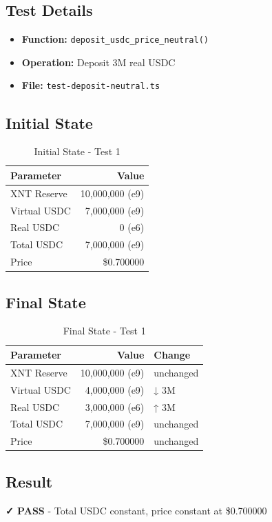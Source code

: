 \documentclass[11pt,a4paper]{article}
\begin{document}
\subsection{Test Details}
\begin{itemize}
    \item \textbf{Function:} \texttt{deposit\_usdc\_price\_neutral()}
    \item \textbf{Operation:} Deposit 3M real USDC
    \item \textbf{File:} \texttt{test-deposit-neutral.ts}
\end{itemize}

\subsection{Initial State}
\begin{table}[h]
\centering
\begin{tabular}{lr}
\toprule
\textbf{Parameter} & \textbf{Value} \\
\midrule
XNT Reserve & 10,000,000 (e9) \\
Virtual USDC & 7,000,000 (e9) \\
Real USDC & 0 (e6) \\
Total USDC & 7,000,000 (e9) \\
Price & \$0.700000 \\
\bottomrule
\end{tabular}
\caption{Initial State - Test 1}
\end{table}

\subsection{Final State}
\begin{table}[h]
\centering
\begin{tabular}{lrl}
\toprule
\textbf{Parameter} & \textbf{Value} & \textbf{Change} \\
\midrule
XNT Reserve & 10,000,000 (e9) & unchanged \\
Virtual USDC & 4,000,000 (e9) & ↓ 3M \\
Real USDC & 3,000,000 (e6) & ↑ 3M \\
Total USDC & 7,000,000 (e9) & unchanged \\
Price & \$0.700000 & unchanged \\
\bottomrule
\end{tabular}
\caption{Final State - Test 1}
\end{table}

\subsection{Result}
\begin{tcolorbox}[colback=success!10,colframe=success]
\textbf{✓ PASS} - Total USDC constant, price constant at \$0.700000
\end{tcolorbox}
\end{document}
